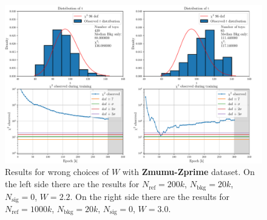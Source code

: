 \begin{figure}[H]
	\centering
	\includegraphics[width=1.0\textwidth]{Python/W_CLIP/wrong_wclip_2-2_3-0.pdf}
	\caption{Results for wrong choices of $W$ with \textbf{Zmumu-Zprime} dataset. On the left side there are the results for $N_\mathrm{ref}=200\si{k}$, $N_\mathrm{bkg}=20\si{k}$, $N_\mathrm{sig}=0$, $W=2.2$. On the right side there are the results for $N_\mathrm{ref}=1000\si{k}$, $N_\mathrm{bkg}=20\si{k}$, $N_\mathrm{sig}=0$, $W=3.0$.}
	\label{fig:WRONG_WCLIP}
\end{figure}